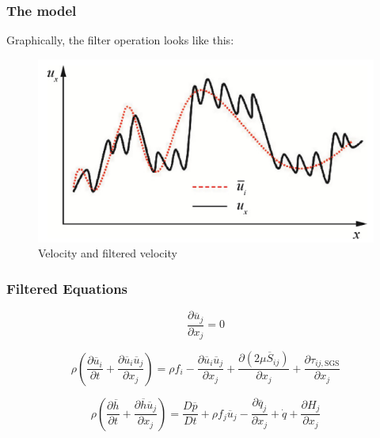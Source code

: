 \documentclass{beamer}
\begin{document}
\begin{frame}
  \frametitle{The model}
  \pause
  Graphically, the filter operation looks like this:
  \begin{figure}[ht] %
    \centering
    \includegraphics[width=1\textwidth]{filtered_velocity.png} %
    \caption{Velocity and filtered velocity \cite{zhiyinLargeeddySimulationPresent2015}} %
    \label{filtered_velocity} %
  \end{figure}
\end{frame}

\begin{frame}
  \frametitle{Filtered Equations}
  \pause
 \begin{equation}
  \frac{\partial \overline{u}_j}{\partial x_j}=0
 \end{equation}
 \pause

  \begin{equation}
    \rho \left( \frac{\partial \overline{u}_i}{\partial t} + 
    \frac{\partial \overline{u}_i \overline{u}_j}{\partial x_j} \right)= 
     \rho f_i -\frac{\partial \overline{u}_i \overline{u}_j}{\partial x_j} 
     + \frac{\partial (2 \mu \overline{S}_{ij})}{\partial x_j} 
     + \frac{\partial \tau_{ij, \text{SGS}}}{\partial x_j}
  \end{equation}

  \pause
  
  \begin{equation}
    \rho \left( \frac{\partial \overline{h}}{\partial t} +
     \frac{\partial \overline{h} \overline{u}_j}{\partial x_j} \right) 
     =  \frac{D \overline{p}}{D t} + \rho f_j \overline{u}_j -
      \frac{\partial \overline{q}_j}{\partial x_j} + \dot{q} +
      \frac{\partial H_j}{\partial x_j}
  \end{equation}
  \pause
\end{frame}
\end{document}
